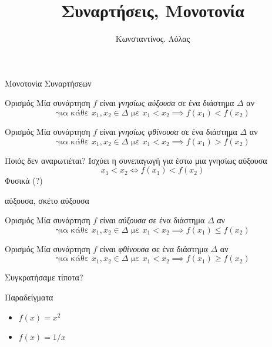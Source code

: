 \documentclass[greek]{beamer}
\title{Συναρτήσεις, Μονοτονία}
\author[Λόλας]{Κωνσταντίνος. Λόλας}
\date{}
\begin{document}
\begin{frame}
 \titlepage
\end{frame}
\begin{frame}{Μονοτονία Συναρτήσεων}
 \begin{block}{Ορισμός}
  Μία συνάρτηση $f$ είναι \emph{γνησίως αύξουσα} σε ένα διάστημα $Δ$ αν
  $$\text{για κάθε } x_1,x_2\in Δ \text{ με } x_1<x_2\implies f(x_1)<f(x_2)$$
 \end{block} \pause
 \begin{block}{Ορισμός}
  Μία συνάρτηση $f$ είναι \emph{γνησίως φθίνουσα} σε ένα διάστημα $Δ$ αν
  $$\text{για κάθε } x_1,x_2\in Δ \text{ με } x_1<x_2\implies f(x_1)>f(x_2)$$
 \end{block}
\end{frame}

\begin{frame}{Ποιός δεν αναρωτιέται?}
 Ισχύει η συνεπαγωγή για έστω μια γνησίως αύξουσα
 $$x_1<x_2\iff f(x_1)<f(x_2)$$
  \pause
 Φυσικά (?)
\end{frame}

\begin{frame}{αύξουσα, σκέτο αύξουσα}
 \begin{block}{Ορισμός}
  Μία συνάρτηση $f$ είναι \emph{αύξουσα} σε ένα διάστημα $Δ$ αν
  $$\text{για κάθε } x_1,x_2\in Δ \text{ με } x_1<x_2\implies f(x_1)\le f(x_2)$$
 \end{block} \pause
 \begin{block}{Ορισμός}
  Μία συνάρτηση $f$ είναι \emph{φθίνουσα} σε ένα διάστημα $Δ$ αν
  $$\text{για κάθε } x_1,x_2\in Δ \text{ με } x_1<x_2\implies f(x_1)\ge f(x_2)$$
 \end{block}
\end{frame}

\begin{frame}{Συγκρατήσαμε τίποτα?}
 \begin{exampleblock}{Παραδείγματα}
  \begin{itemize}
   \item $f(x)=x^2$ \pause
   \item $f(x)=1/x$
  \end{itemize}
 \end{exampleblock}
\end{frame}
\end{document}
